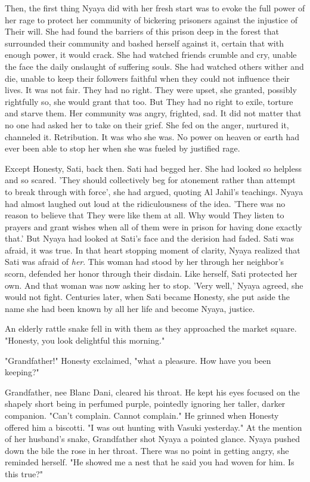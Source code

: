 \documentclass{amsart}
\begin{document}
Then, the first thing Nyaya did with her fresh start was to evoke the full power of her rage to protect her community of bickering prisoners against the injustice of Their will. She had found the barriers of this prison deep in the forest that surrounded their community and bashed herself against it, certain that with enough power, it would crack. She had watched friends crumble and cry, unable the face the daily onslaught of suffering souls. She had watched others wither and die, unable to keep their followers faithful when they could not influence their lives. It was not fair. They had no right. They were upset, she granted, possibly rightfully so, she would grant that too. But They had no right to exile, torture and starve them. Her community was angry, frighted, sad. It did not matter that no one had asked her to take on their grief. She fed on the anger, nurtured it, channeled it. Retribution. It was who she was. No power on heaven or earth had ever been able to stop her when she was fueled by justified rage. 

Except Honesty, Sati, back then. Sati had begged her. She had looked so helpless and so scared. 'They should collectively beg for atonement rather than attempt to break through with force', she had argued, quoting Al Jahil's teachings. Nyaya had almost laughed out loud at the ridiculousness of the idea. 'There was no reason to believe that They were like them at all. Why would They listen to prayers and grant wishes when all of them were in prison for having done exactly that.' But Nyaya had looked at Sati's face and the derision had faded. Sati was afraid, it was true. In that heart stopping moment of clarity, Nyaya realized that Sati was afraid of \emph{her}. This woman had stood by her through her neighbor's scorn, defended her honor through their disdain. Like herself, Sati protected her own. And that woman was now asking her to stop. 'Very well,' Nyaya agreed, she would not fight. Centuries later, when Sati became Honesty, she put aside the name she had been known by all her life and become Nyaya, justice. 

An elderly rattle snake fell in with them as they approached the market square. "Honesty, you look delightful this morning."

"Grandfather!" Honesty exclaimed, "what a pleasure. How have you been keeping?" 

Grandfather, nee Blanc Dani, cleared his throat. He kept his eyes focused on the shapely short being in perfumed purple, pointedly ignoring her taller, darker companion. "Can't complain. Cannot complain."  He grinned when Honesty offered him a biscotti. "I was out hunting with Vasuki yesterday." At the mention of her husband's snake, Grandfather shot Nyaya a pointed glance. Nyaya pushed down the bile the rose in her throat. There was no point in getting angry, she reminded herself. "He showed me a nest that he said you had woven for him. Is this true?"
\end{document}
